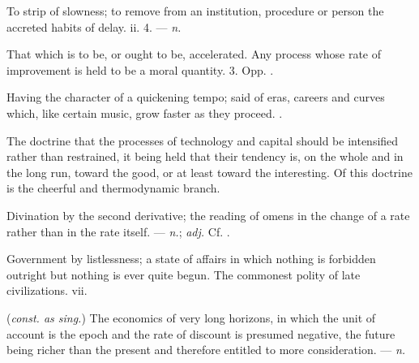  To strip of slowness; to remove from an institution, procedure or person the accreted habits of delay.   ii. 4. ---  \textit{n.}

  That which is to be, or ought to be, accelerated.   Any process whose rate of improvement is held to be a moral quantity.   3. Opp. .

 Having the character of a quickening tempo; said of eras, careers and curves which, like certain music, grow faster as they proceed. .

 The doctrine that the processes of technology and capital should be intensified rather than restrained, it being held that their tendency is, on the whole and in the long run, toward the good, or at least toward the interesting. Of this doctrine  is the cheerful and thermodynamic branch.

 Divination by the second derivative; the reading of omens in the change of a rate rather than in the rate itself.  ---  \textit{n.};  \textit{adj.} Cf. .

 Government by listlessness; a state of affairs in which nothing is forbidden outright but nothing is ever quite begun. The commonest polity of late civilizations.   vii.

 (\textit{const. as sing.}) The economics of very long horizons, in which the unit of account is the epoch and the rate of discount is presumed negative, the future being richer than the present and therefore entitled to more consideration. ---  \textit{n.}

